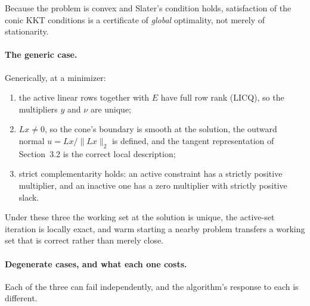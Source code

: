 \documentclass[11pt,a4paper]{article}
\begin{document}
Because the problem is convex and Slater's condition holds,
satisfaction of the conic KKT conditions is a certificate of
\emph{global} optimality, not merely of stationarity.

\paragraph{The generic case.} Generically, at a minimizer:

\begin{enumerate}
    \item the active linear rows together with $E$ have full row rank
    (LICQ), so the multipliers $y$ and $\nu$ are unique;

    \item $Lx\neq0$, so the cone's boundary is smooth at the solution,
    the outward normal $u=Lx/\|Lx\|_2$ is defined, and the tangent
    representation of Section~3.2 is the correct local description;

    \item strict complementarity holds: an active constraint has a
    strictly positive multiplier, and an inactive one has a zero
    multiplier with strictly positive slack.
\end{enumerate}

Under these three the working set at the solution is unique, the
active-set iteration is locally exact, and warm starting a nearby
problem transfers a working set that is correct rather than merely
close.

\paragraph{Degenerate cases, and what each one costs.} Each of the
three can fail independently, and the algorithm's response to each is
different.
\end{document}
